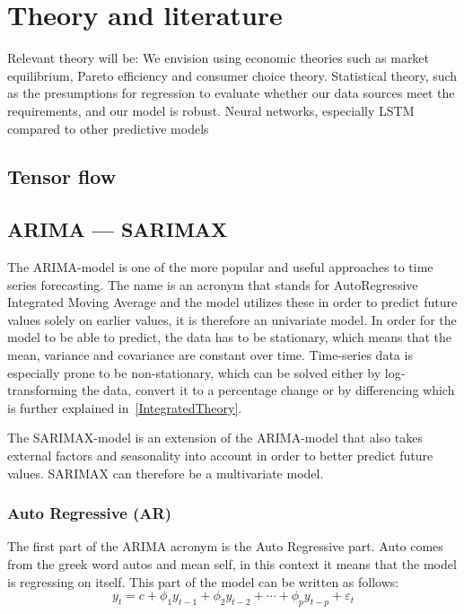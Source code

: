 \section{Theory and literature}

Relevant theory will be: 
We envision using economic theories such as market equilibrium, Pareto efficiency and consumer choice theory. 
Statistical theory, such as the presumptions for regression to evaluate whether our data sources meet the requirements, and our model is robust. 
Neural networks, especially LSTM compared to other predictive models 

\subsection{Tensor flow}

\subsection{ARIMA --- SARIMAX}\label{ARIMATheory}

The ARIMA-model is one of the more popular and useful approaches to time series forecasting. The name is an acronym that stands for AutoRegressive Integrated Moving Average and the model utilizes these in order to predict future values solely on earlier values, it is therefore an univariate model. In order for the model to be able to predict, the data has to be stationary, which means that the mean, variance and covariance are constant over time. Time-series data is especially prone to be non-stationary, which can be solved either by log-transforming the data, convert it to a percentage change or by differencing which is further explained in~\ref{IntegratedTheory}.

The SARIMAX-model is an extension of the ARIMA-model that also takes external factors and seasonality into account in order to better predict future values. SARIMAX can therefore be a multivariate model. \parencite{hyndman_athanasopoulos_2021}

\subsubsection{Auto Regressive (AR)}\label{AutoRegressiveTheory}
The first part of the ARIMA acronym is the Auto Regressive part. Auto comes from the greek word autos and mean self, in this context it means that the model is regressing on itself. This part of the model can be written as follows:
\begin{equation}
y_{t} = c + \phi_{1}y_{t-1} + \phi_{2}y_{t-2} + \cdots + \phi_{p}y_{t-p} + \varepsilon_{t}
\end{equation}

